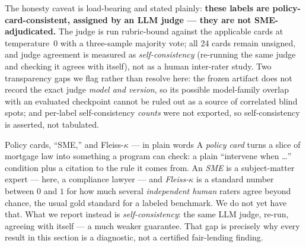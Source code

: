 The honesty caveat is load-bearing and stated plainly: \textbf{these labels are policy-card-consistent,
assigned by an LLM judge --- they are not SME-adjudicated.} The judge is run rubric-bound against the
applicable cards at temperature~$0$ with a three-sample majority vote; all 24 cards remain unsigned, and
judge agreement is measured as \emph{self-consistency} (re-running the same judge and checking it agrees
with itself), not as a human inter-rater study. Two transparency gaps we flag rather than resolve here: the
frozen artifact does not record the exact judge \emph{model and version}, so its
possible model-family overlap with an evaluated checkpoint cannot be ruled out as a source of correlated
blind spots; and per-label self-consistency \emph{counts} were not exported, so self-consistency is asserted,
not tabulated.

\begin{background}{Policy cards, ``SME,'' and Fleiss-\texorpdfstring{$\kappa$}{kappa} --- in plain words}
A \emph{policy card} turns a slice of mortgage law into something a program can check: a plain
``intervene when \ldots'' condition plus a citation to the rule it comes from. An \emph{SME} is a
subject-matter expert --- here, a compliance lawyer --- and \emph{Fleiss-$\kappa$} is a standard number
between $0$ and $1$ for how much several \emph{independent human} raters agree beyond chance, the usual
gold standard for a labeled benchmark. We do not yet have that. What we report instead is
\emph{self-consistency}: the same LLM judge, re-run, agreeing with itself --- a much weaker guarantee.
That gap is precisely why every result in this section is a diagnostic, not a certified fair-lending
finding.
\end{background}


